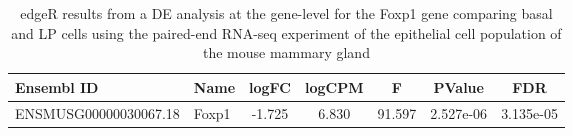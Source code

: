 \begin{table}

\caption{\label{tab:mouse_eda_table_foxp1}edgeR results from a DE analysis at the gene-level for the Foxp1 gene comparing basal and LP cells using the paired-end RNA-seq experiment of the epithelial cell population of the mouse mammary gland}
\centering
\fontsize{10}{12}\selectfont
\begin{tabular}[t]{llccccc}
\toprule
Ensembl ID & Name & logFC & logCPM & F & PValue & FDR\\
\midrule
ENSMUSG00000030067.18 & Foxp1 & -1.725 & 6.830 & 91.597 & 2.527e-06 & 3.135e-05\\
\bottomrule
\end{tabular}
\end{table}
